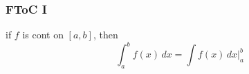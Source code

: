 		\subsubsection{FToC I}
			\begin{theorem}
				if $f$ is cont on $[a,b]$, then
				$$\int_a^bf(x)\,dx=\int f(x)\,dx\Big|_a^b$$
			\end{theorem}
